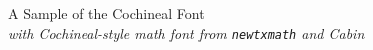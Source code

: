 \documentclass[11pt]{article}
\begin{document}
{\LARGE \noindent A Sample of the Cochineal Font}\\

{\large \noindent \textit{with Cochineal-style math font from \texttt{newtxmath} and Cabin}}\\[5pt]


\end{document}
